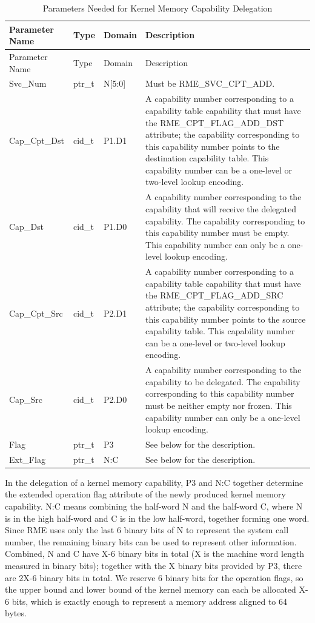 \begin{xltabular}{\textwidth}{@{}>{\hsize\raggedright\arraybackslash}X>{\hsize\raggedright\arraybackslash}X>{\hsize\raggedright\arraybackslash}X>{\hsize\raggedright\arraybackslash}X@{}}
\caption{Parameters Needed for Kernel Memory Capability Delegation}\label{tab:3-23-kernel-memory-capability-transfer-parameters}\\
\toprule
Parameter Name & Type & Domain & Description\tabularnewline
\endfirsthead
\toprule
Parameter Name & Type & Domain & Description\tabularnewline
\midrule
\endhead
\bottomrule
\endlastfoot
Svc\_Num & ptr\_t & N{[}5:0{]} & Must be RME\_SVC\_CPT\_ADD.\tabularnewline
Cap\_Cpt\_Dst & cid\_t & P1.D1 &
A capability number corresponding to a capability table capability that must have the RME\_CPT\_FLAG\_ADD\_DST attribute; the capability corresponding to this capability number points to the destination capability table. This capability number can be a one-level or two-level lookup encoding.\tabularnewline
Cap\_Dst & cid\_t & P1.D0 &
A capability number corresponding to the capability that will receive the delegated capability. The capability corresponding to this capability number must be empty. This capability number can only be a one-level lookup encoding.\tabularnewline
Cap\_Cpt\_Src & cid\_t & P2.D1 &
A capability number corresponding to a capability table capability that must have the RME\_CPT\_FLAG\_ADD\_SRC attribute; the capability corresponding to this capability number points to the source capability table. This capability number can be a one-level or two-level lookup encoding.\tabularnewline
Cap\_Src & cid\_t & P2.D0 &
A capability number corresponding to the capability to be delegated. The capability corresponding to this capability number must be neither empty nor frozen. This capability number can only be a one-level lookup encoding.\tabularnewline
Flag & ptr\_t & P3 & See below for the description.\tabularnewline
Ext\_Flag & ptr\_t & N:C & See below for the description.\tabularnewline
\end{xltabular}
\nopagebreak[4]

In the delegation of a kernel memory capability, P3 and N:C together determine the extended operation flag attribute of the newly produced kernel memory capability. N:C means combining the half-word N and the half-word C, where N is in the high half-word and C is in the low half-word, together forming one word. Since RME uses only the last 6 binary bits of N to represent the system call number, the remaining binary bits can be used to represent other information. Combined, N and C have X-6 binary bits in total (X is the machine word length measured in binary bits); together with the X binary bits provided by P3, there are 2X-6 binary bits in total. We reserve 6 binary bits for the operation flags, so the upper bound and lower bound of the kernel memory can each be allocated X-6 bits, which is exactly enough to represent a memory address aligned to 64 bytes.

